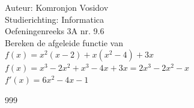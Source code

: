 \documentclass[a4paper]{article}
\begin{document}
	
	\noindent \large Auteur: Komronjon Vosidov \\
	\noindent \large Studierichting: Informatica\\
	\noindent \large Oefeningenreeks 3A nr. 9.6\\
	
	
	
	\normalsize
	Bereken de afgeleide functie van\\
	
	$f(x) = x^2 (x - 2) + x (x^2 - 4) + 3x$\\
	
	$f(x) =x^3 - 2x^2 + x^3 -4x + 3x = 2x^3 - 2x^2 - x$\\
	
	$f'(x) =6x^2 - 4x - 1$\\
	
	
	
	
	
	
	\begin{thebibliography}{999}
	\end{thebibliography}	
	
\end{document}
